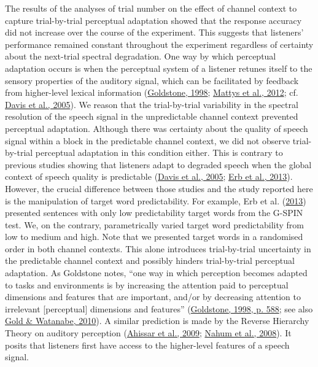 \documentclass[a4paper, nobind]{templates/ociamthesis}
\begin{document}
The results of the analyses of trial number on the effect of channel context to capture trial-by-trial perceptual adaptation showed that the response accuracy did not increase over the course of the experiment.
This suggests that listeners' performance remained constant throughout the experiment regardless of certainty about the next-trial spectral degradation.
One way by which perceptual adaptation occurs is when the perceptual system of a listener retunes itself to the sensory properties of the auditory signal,
which can be facilitated by feedback from higher-level lexical information (\protect\hyperlink{ref-Goldstone1998}{Goldstone, 1998}; \protect\hyperlink{ref-Mattys2012}{Mattys et al., 2012}; cf. \protect\hyperlink{ref-Davis2005}{Davis et al., 2005}).
We reason that the trial-by-trial variability in the spectral resolution of the speech signal in the unpredictable channel context prevented perceptual adaptation.
Although there was certainty about the quality of speech signal within a block in the predictable channel context, we did not observe trial-by-trial perceptual adaptation in this condition either.
This is contrary to previous studies showing that listeners adapt to degraded speech when the global context of speech quality is predictable (\protect\hyperlink{ref-Davis2005}{Davis et al., 2005}; \protect\hyperlink{ref-Erb2013}{Erb et al., 2013}).
However, the crucial difference between those studies and the study reported here is the manipulation of target word predictability.
For example, Erb et al. (\protect\hyperlink{ref-Erb2013}{2013}) presented sentences with only low predictability target words from the G-SPIN test.
We, on the contrary, parametrically varied target word predictability from low to medium and high.
Note that we presented target words in a randomised order in both channel contexts.
This alone introduces trial-by-trial uncertainty in the predictable channel context and possibly hinders trial-by-trial perceptual adaptation.
As Goldstone notes, ``one way in which perception becomes adapted to tasks and environments is by increasing the attention paid to perceptual dimensions and features that are important, and/or by decreasing attention to irrelevant {[}perceptual{]} dimensions and features'' (\protect\hyperlink{ref-Goldstone1998}{Goldstone, 1998, p. 588}; see also \protect\hyperlink{ref-Gold2010}{Gold \& Watanabe, 2010}).
A similar prediction is made by the Reverse Hierarchy Theory on auditory perception (\protect\hyperlink{ref-Ahissar2009}{Ahissar et al., 2009}; \protect\hyperlink{ref-Nahum2008}{Nahum et al., 2008}).
It posits that listeners first have access to the higher-level features of a speech signal.
\end{document}
